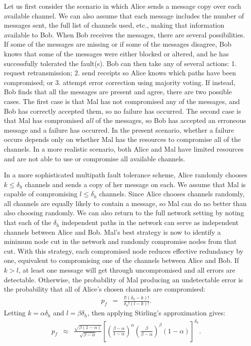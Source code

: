 \documentclass[sigconf]{acmart}
\newcommand{\beq}{\begin{eqnarray}}
\newcommand{\eeq}{\end{eqnarray}}
\begin{document}
Let us first consider the scenario in which
Alice sends a message copy over each available channel.
We can also assume that each message includes the number of messages sent,
the full list of channels used, etc.,
making that information available to Bob.
When Bob receives the messages, there are several possibilities.
If some of the messages are missing
or if some of the messages disagree,
Bob knows that some of the messages were either blocked or altered,
and he has successfully tolerated the fault(s).
Bob can then take any of several actions:
1. request retransmission;
2. send receipts so Alice knows which paths have been compromised;
or 3. attempt error correction using majority voting.
If instead, Bob finds that all the messages are present and agree,
there are two possible cases.
The first case is that Mal has not compromised any of the messages,
and Bob has correctly accepted them, so no failure has occurred.
The second case is that Mal has compromised {\em all} of the messages,
so Bob has accepted an erroneous message and a failure has occurred.
In the present scenario,
whether a failure occurs depends only on whether Mal has the resources to
compromise all of the channels.
In a more realistic scenario,
both Alice and Mal have limited resources and are not able to use or
compromise all available channels.

In a more sophisticated multipath fault tolerance scheme,
Alice randomly chooses $k \leq \delta_h$ channels and sends a copy of
her message on each.
We assume that Mal is capable of compromising $l \leq \delta_h$ channels.
Since Alice chooses channels randomly,
all channels are equally likely to contain a message,
so Mal can do no better than also choosing randomly.
We can also return to the full network setting by noting that each of the
$\delta_h$ independent paths in the network can serve as independent channels
between Alice and Bob.
Mal's best strategy is now to identify a minimum node cut in the network
and randomly compromise nodes from that cut.
With this strategy, each compromised node reduces effective redundancy by one,
equivalent to compromising one of the channels between Alice and Bob.
If $k > l$, at least one message will get through uncompromised and all
errors are detectable.
Otherwise, the probability of Mal producing an undetectable error is
the probability that all of Alice's chosen channels are compromised:
\beq
\label{eq:pf}
p_f &=& \frac{l!(\delta_h-k)!}{\delta_h!(l-k)!}.
\eeq
Letting $k=\alpha \delta_h$ and $l=\beta \delta_h$, then applying Stirling's
approximation gives:
\begin{eqnarray}
\label{eq:pf_approx}
p_f &\approx&
\frac{\sqrt{\beta(1-\alpha)}}{\sqrt{\beta-\alpha}}
\left[
    \left( \frac{\beta-\alpha}{1-\alpha} \right)^{\alpha}
    \left( \frac{\beta}{\beta-\alpha} \right)^{\beta}
    (1-\alpha)
\right]^{\delta_h}.
\end{eqnarray}
\end{document}
